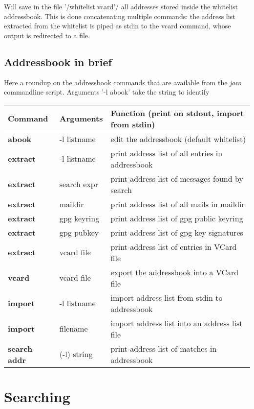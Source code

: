 \documentclass[a4,onecolumn,portrait]{article}
\begin{document}
Will save in the file '/whitelist.vcard'/ all addresses stored inside the whitelist addressbook. This is done concatenating multiple commands: the address list extracted from the whitelist is piped as stdin to the vcard command, whose output is redirected to a file.
\subsection{Addressbook in brief}
\label{sec-7-3}

Here a roundup on the addressbook commands that are available from the \emph{jaro} commandline script. Arguments '-l abook' take the string to identify

\begin{center}
\begin{tabular}{lll}
Command & Arguments & Function (print on stdout, import from stdin)\\
\hline
\textbf{abook} & -l listname & edit the addressbook (default whitelist)\\
\textbf{extract} & -l listname & print address list of all entries in addressbook\\
\textbf{extract} & search expr & print address list of messages found by search\\
\textbf{extract} & maildir & print address list of all mails in maildir\\
\textbf{extract} & gpg keyring & print address list of gpg public keyring\\
\textbf{extract} & gpg pubkey & print address list of gpg key signatures\\
\textbf{extract} & vcard file & print address list of entries in VCard file\\
\textbf{vcard} & vcard file & export the addressbook into a VCard file\\
\textbf{import} & -l listname & import address list from stdin to addressbook\\
\textbf{import} & filename & import address list into an address list file\\
\textbf{search addr} & (-l) string & print address list of matches in addressbook\\
\end{tabular}
\end{center}


\section{Searching}
\label{sec-8}
\end{document}
